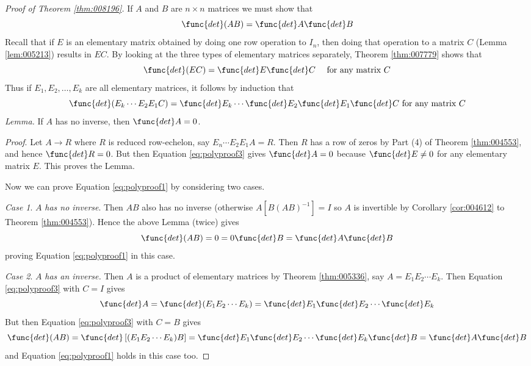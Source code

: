 \begin{proof}[Proof of Theorem \ref{thm:008196}]
If $A$ and $B$ are $n \times n$ matrices we must show that
\begin{equation}\label{eq:polyproof1}
\func{det} (AB) = \func{det } A \func{det } B
\end{equation}
Recall that if $E$ is an elementary matrix obtained by doing one row operation to $I_{n}$, then doing that operation to a matrix $C$ (Lemma \ref{lem:005213}) results in $EC$. By looking at the three types of elementary matrices separately, Theorem \ref{thm:007779} shows that
\begin{equation}\label{eq:polyproof2}
\func{det} (EC) = \func{det } E \func{det } C \quad \mbox{ for any matrix } C
\end{equation}
Thus if $E_{1}, E_{2}, \dots, E_{k}$ are all elementary matrices, it follows by induction that
\begin{equation}\label{eq:polyproof3}
\func{det} (E_k \cdots E_2E_1C) = \func{det } E_k \cdots \func{det } E_2 \func{det } E_1 \func{det } C \mbox{ for any matrix } C
\end{equation}
\textit{Lemma.} If $A$ has no inverse, then $\func{det } A = 0$.


\textit{Proof}. Let $A \to R$ where $R$ is reduced row-echelon, say $E_{n} \cdots E_{2}E_{1}A = R$. Then $R$ has a row of zeros by Part (4) of Theorem \ref{thm:004553},  and hence $\func{det } R = 0$. But then Equation \ref{eq:polyproof3} gives $\func{det }A = 0$ because $\func{det } E \neq 0$ for any elementary matrix $E$. This proves the Lemma.


Now we can prove Equation \ref{eq:polyproof1} by considering two cases.


\noindent \textit{Case 1}. $A$ \textit{has no inverse}. Then $AB$ also has no inverse (otherwise $A[B(AB)^{-1}] = I$ so $A$ is invertible by Corollary \ref{cor:004612} to Theorem \ref{thm:004553}). Hence the above Lemma (twice) gives
\begin{equation*}
\func{det} (AB) = 0 = 0 \func{det } B = \func{det } A \func{det } B
\end{equation*}
proving Equation \ref{eq:polyproof1} in this case.


\noindent \textit{Case 2}. $A$ \textit{has an inverse.} Then $A$ is a product of elementary matrices by Theorem \ref{thm:005336}, say $A = E_{1}E_{2}\cdots E_{k}$. Then Equation \ref{eq:polyproof3} with $C = I$ gives
\begin{equation*}
\func{det } A = \func{det} (E_1E_2\cdots E_k)= \func{det } E_1 \func{det } E_2 \cdots \func{det } E_k
\end{equation*}
But then Equation \ref{eq:polyproof3} with $C = B$ gives
\begin{equation*}
\func{det}(AB) = \func{det} \left[(E_1E_2\cdots E_k)B \right]= \func{det } E_1 \func{det } E_2 \cdots \func{det } E_k \func{det } B = \func{det } A \func{det } B
\end{equation*}
and Equation \ref{eq:polyproof1} holds in this case too.
\end{proof}


